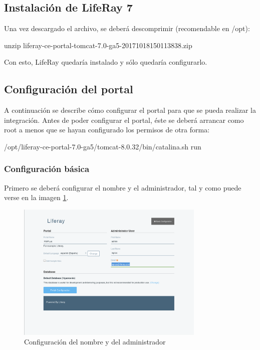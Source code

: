 \subsection{Instalación de LifeRay 7}
\par Una vez descargado el archivo, se deberá descomprimir (recomendable en /opt):
\begin{listing}[style=consola, numbers=none]
unzip liferay-ce-portal-tomcat-7.0-ga5-20171018150113838.zip
\end{listing}
\par Con esto, LifeRay quedaría instalado y sólo quedaría configurarlo.


\subsection{Configuración del portal}

\par A continuación se describe cómo configurar el portal para que se pueda realizar la integración. Antes de poder configurar el portal, éste se deberá arrancar como root a menos que se hayan configurado los permisos de otra forma:
\begin{listing}[style=consola, numbers=none]
/opt/liferay-ce-portal-7.0-ga5/tomcat-8.0.32/bin/catalina.sh run
\end{listing}


\subsubsection{Configuración básica}
\par Primero se deberá configurar el nombre y el administrador, tal y como puede verse en la imagen \ref{img:lr1}.

\begin{figure}[H]
\begin{center}
\includegraphics[width=0.8\textwidth]{./img/liferay/1.png}
\end{center}
\caption{Configuración del nombre y del administrador}
\label{img:lr1}
\end{figure}

